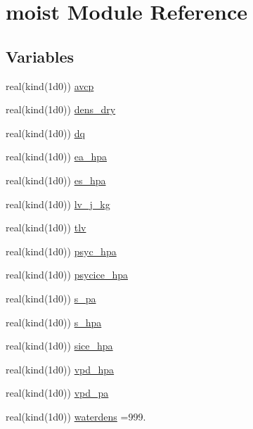 \hypertarget{namespacemoist}{}\section{moist Module Reference}
\label{namespacemoist}
\subsection*{Variables}
\begin{DoxyCompactItemize}
\item 
real(kind(1d0)) \hyperlink{namespacemoist_ab97dbf8fcbd5d11d712712430254200c}{avcp}
\item 
real(kind(1d0)) \hyperlink{namespacemoist_a86e17481beeffe41b498ff747fc52360}{dens\+\_\+dry}
\item 
real(kind(1d0)) \hyperlink{namespacemoist_ac54b9750ff8d2f544e3706dc3c7ea73d}{dq}
\item 
real(kind(1d0)) \hyperlink{namespacemoist_a19f55d056cfde820ca8beafe774a0688}{ea\+\_\+hpa}
\item 
real(kind(1d0)) \hyperlink{namespacemoist_a711adf6d19a4bb7b9a6c55d39dd5357b}{es\+\_\+hpa}
\item 
real(kind(1d0)) \hyperlink{namespacemoist_a59a8f410cf3ebfe343d9c01b5dbb2cf8}{lv\+\_\+j\+\_\+kg}
\item 
real(kind(1d0)) \hyperlink{namespacemoist_a4572c899e5e83d9647c7ed9f16901c24}{tlv}
\item 
real(kind(1d0)) \hyperlink{namespacemoist_a8a8d0c665be356954056ed6c102b953b}{psyc\+\_\+hpa}
\item 
real(kind(1d0)) \hyperlink{namespacemoist_a6c83d3efeb2f1e2423e18064a8935c6e}{psycice\+\_\+hpa}
\item 
real(kind(1d0)) \hyperlink{namespacemoist_aa7e2596730c9a1b91e912106c46d11fe}{s\+\_\+pa}
\item 
real(kind(1d0)) \hyperlink{namespacemoist_ab898e28f0ece3e6a2c1852fd8fe61bc1}{s\+\_\+hpa}
\item 
real(kind(1d0)) \hyperlink{namespacemoist_a38df7531f904d511b341f35b56ab56f3}{sice\+\_\+hpa}
\item 
real(kind(1d0)) \hyperlink{namespacemoist_aad393ebb822062a86d42176ac76b30ad}{vpd\+\_\+hpa}
\item 
real(kind(1d0)) \hyperlink{namespacemoist_a86ab3b130c4af24cd94e0859a73c58e6}{vpd\+\_\+pa}
\item 
real(kind(1d0)) \hyperlink{namespacemoist_a7d9cfae074d81f978b44ac92bf94b32b}{waterdens} =999.
\end{DoxyCompactItemize}


